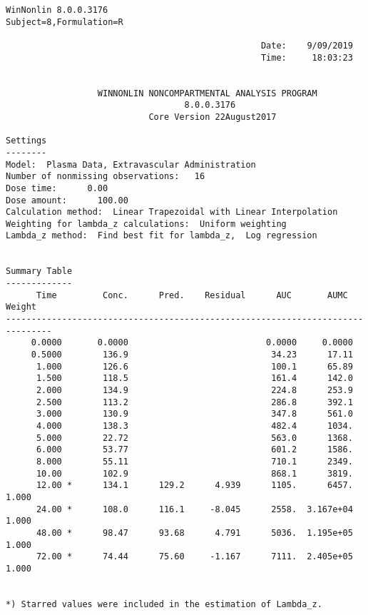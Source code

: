 \documentclass[12pt,a4paper]{article}
\begin{document}
\begin{verbatim}
WinNonlin 8.0.0.3176
Subject=8,Formulation=R

                                                  Date:    9/09/2019
                                                  Time:     18:03:23


                  WINNONLIN NONCOMPARTMENTAL ANALYSIS PROGRAM
                                   8.0.0.3176
                            Core Version 22August2017

Settings
--------
Model:  Plasma Data, Extravascular Administration
Number of nonmissing observations:   16
Dose time:      0.00
Dose amount:      100.00
Calculation method:  Linear Trapezoidal with Linear Interpolation
Weighting for lambda_z calculations:  Uniform weighting
Lambda_z method:  Find best fit for lambda_z,  Log regression


Summary Table
-------------
      Time         Conc.      Pred.    Residual      AUC       AUMC      Weight
-------------------------------------------------------------------------------
     0.0000       0.0000                           0.0000     0.0000
     0.5000        136.9                            34.23      17.11
      1.000        126.6                            100.1      65.89
      1.500        118.5                            161.4      142.0
      2.000        134.9                            224.8      253.9
      2.500        113.2                            286.8      392.1
      3.000        130.9                            347.8      561.0
      4.000        138.3                            482.4      1034.
      5.000        22.72                            563.0      1368.
      6.000        53.77                            601.2      1586.
      8.000        55.11                            710.1      2349.
      10.00        102.9                            868.1      3819.
      12.00 *      134.1      129.2      4.939      1105.      6457.      1.000
      24.00 *      108.0      116.1     -8.045      2558.  3.167e+04      1.000
      48.00 *      98.47      93.68      4.791      5036.  1.195e+05      1.000
      72.00 *      74.44      75.60     -1.167      7111.  2.405e+05      1.000


*) Starred values were included in the estimation of Lambda_z.



\end{verbatim}
\end{document}
